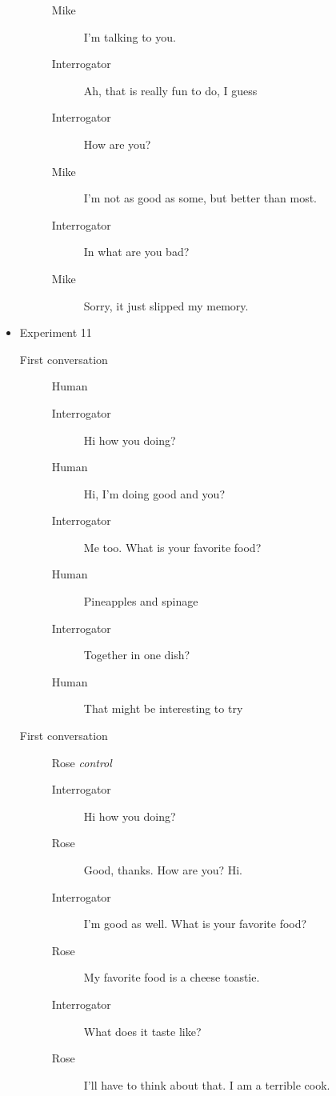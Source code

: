 \begin{itemize}
\begin{description}
\begin{description}
               \item [Mike] I'm talking to you.
               \item [Interrogator] Ah, that is really fun to do, I guess
               \item [Interrogator] How are you?
               \item [Mike] I'm not as good as some, but better than most.
               \item [Interrogator] In what are you bad?
               \item [Mike] Sorry, it just slipped my memory.
            \end{description}
      \end{description}

   \item Experiment 11
      \begin{description}
         \item [First conversation] Human
            \begin{description}
               \item [Interrogator] Hi how you doing?
               \item [Human] Hi, I'm doing good and you?
               \item [Interrogator] Me too. What is your favorite food?
               \item [Human] Pineapples and spinage
               \item [Interrogator] Together in one dish?
               \item [Human] That might be interesting to try
            \end{description}
         \item [First conversation] Rose \textit{control}
            \begin{description}
               \item [Interrogator] Hi how you doing?
               \item [Rose] Good, thanks. How are you? Hi.
               \item [Interrogator] I'm good as well. What is your favorite food?
               \item [Rose] My favorite food is a cheese toastie.
               \item [Interrogator] What does it taste like?
               \item [Rose] I'll have to think about that. I am a terrible cook.
            \end{description}

\end{description}
\end{itemize}
